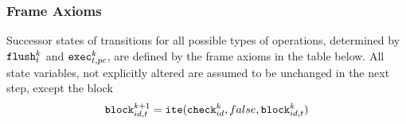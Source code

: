 





\subsubsection{Frame Axioms}

\newcommand{\EFFECTIVE}{\texttt{effective}}
\newcommand{\MSB}{\texttt{msb}}

\noindent
Successor states of transitions for all possible types of operations, determined by $\texttt{flush}^k_t$ and $\texttt{exec}^k_{t, pc}$, are defined by the frame axioms in the table below.
All state variables, not explicitly altered are assumed to be unchanged in the next step, except the block
\[
  \texttt{block}^{k + 1}_{id, t} = \texttt{ite}(\texttt{check}^k_{id}, false, \texttt{block}^k_{id, t})
\]

